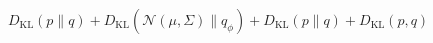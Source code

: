 \newcommand{\KL}[2]{D_{\mathrm{KL}}(#1 \| #2)}
$\KL{p}{q} + \KL{\mathcal{N}(\mu, \Sigma)}{q_\phi} + \KL{p}{q} + D_{\mathrm{KL}}(p, q)$
